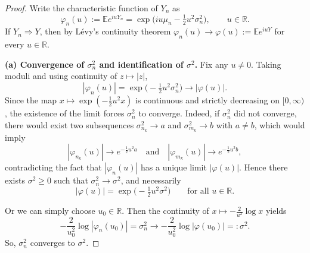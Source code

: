 \documentclass[12pt]{article}
\renewcommand{\(}{\left(}%
\renewcommand{\)}{\right)}%
\renewcommand{\[}{\left[}%
\renewcommand{\]}{\right]}%
\renewcommand{\r}{\mathbb{R}}
\newtheorem{proof}{Proof.}}
\begin{document}
\begin{proof}
Write the characteristic function of $Y_n$ as
\begin{equation*}
\varphi_n(u):=\mathbb E e^{iuY_n}
=\exp\!\Big(iu\mu_n-\tfrac12 u^2\sigma_n^2\Big),\qquad u\in\mathbb R.
\end{equation*}
If $Y_n\Rightarrow Y$, then by Lévy's continuity theorem $\varphi_n(u)\to \varphi(u):=\mathbb E e^{iuY}$ for every $u\in\mathbb R$.

\smallskip
\noindent\textbf{(a) Convergence of $\sigma_n^2$ and identification of $\sigma^2$.}
Fix any $u\neq 0$. Taking moduli and using continuity of $z\mapsto |z|$,
\begin{equation*}
|\varphi_n(u)|
=\exp\!\Big(-\tfrac12 u^2\sigma_n^2\Big)
\longrightarrow
|\varphi(u)|.
\end{equation*}
Since the map $x\mapsto \exp(-\tfrac12 u^2 x)$ is continuous and strictly decreasing on $[0,\infty)$, the existence of the limit forces $\sigma_n^2$ to converge. Indeed, if $\sigma_n^2$ did not converge, there would exist two subsequences $\sigma_{n_k}^2\to a$ and $\sigma_{m_k}^2\to b$ with $a\neq b$, which would imply
\begin{equation*}
|\varphi_{n_k}(u)|\to e^{-\frac12u^2 a}
\quad\text{and}\quad
|\varphi_{m_k}(u)|\to e^{-\frac12u^2 b},
\end{equation*}
contradicting the fact that $|\varphi_n(u)|$ has a unique limit $|\varphi(u)|$.
Hence there exists $\sigma^2\ge 0$ such that $\sigma_n^2\to \sigma^2$, and necessarily
\begin{equation*}
|\varphi(u)|=\exp\!\Big(-\tfrac12 u^2\sigma^2\Big)\qquad\text{for all }u\in\mathbb R.
\end{equation*}

Or we can simply choose $u_0\in\r$. Then the continuity of $x\mapsto -\frac{2}{u^2}\log x$ yields
\begin{equation*}
	-\frac{2}{u_0^2}\log |\varphi_n(u_0)|=\sigma_n^2\to -\frac{2}{u_0^2}\log |\varphi(u_0)|=:\sigma^2.
\end{equation*}
So, $\sigma_n^2$ converges to $\sigma^2$.


\end{proof}
\end{document}
